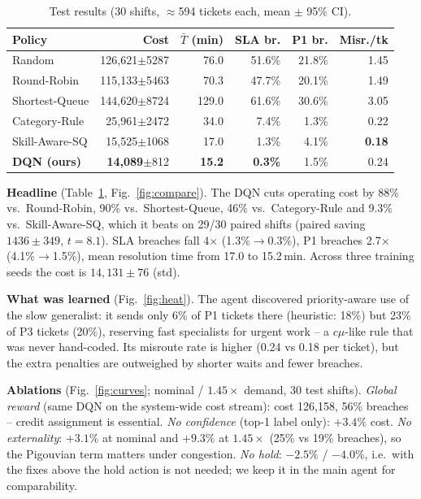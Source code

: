 \documentclass[10pt,twocolumn]{article}
\begin{document}
\begin{table}[t]
\centering\footnotesize\setlength{\tabcolsep}{2.4pt}
\caption{Test results (30 shifts, $\approx$594 tickets each, mean $\pm$ 95\% CI).}
\label{tab:main}
\begin{tabular}{lrrrrr}
\toprule
Policy & Cost & $\bar T$ (min) & SLA br. & P1 br. & Misr./tk\\
\midrule
Random         & 126{,}621$\pm$5287 & 76.0 & 51.6\% & 21.8\% & 1.45\\
Round-Robin    & 115{,}133$\pm$5463 & 70.3 & 47.7\% & 20.1\% & 1.49\\
Shortest-Queue & 144{,}620$\pm$8724 & 129.0 & 61.6\% & 30.6\% & 3.05\\
Category-Rule  & 25{,}961$\pm$2472 & 34.0 & 7.4\% & 1.3\% & 0.22\\
Skill-Aware-SQ & 15{,}525$\pm$1068 & 17.0 & 1.3\% & 4.1\% & \textbf{0.18}\\
\textbf{DQN (ours)} & \textbf{14{,}089}$\pm$812 & \textbf{15.2} & \textbf{0.3\%} & 1.5\% & 0.24\\
\bottomrule
\end{tabular}
\end{table}


\textbf{Headline} (Table~\ref{tab:main}, Fig.~\ref{fig:compare}). The DQN cuts operating cost by 88\% vs.\ Round-Robin,
90\% vs.\ Shortest-Queue, 46\% vs.\ Category-Rule and 9.3\% vs.\ Skill-Aware-SQ, which it beats
on 29/30 paired shifts (paired saving $1436\pm349$, $t{=}8.1$). SLA breaches fall
4$\times$ (1.3\%$\to$0.3\%), P1 breaches 2.7$\times$ (4.1\%$\to$1.5\%), mean resolution time from
17.0 to 15.2\,min. Across three training seeds the cost is $14{,}131\pm76$ (std).

\textbf{What was learned} (Fig.~\ref{fig:heat}). The agent discovered priority-aware use of the
slow generalist: it sends only 6\% of P1 tickets there (heuristic: 18\%) but 23\% of P3 tickets
(20\%), reserving fast specialists for urgent work -- a $c\mu$-like rule that was never
hand-coded. Its misroute rate is higher (0.24 vs 0.18 per ticket), but the extra penalties are
outweighed by shorter waits and fewer breaches.

\textbf{Ablations} (Fig.~\ref{fig:curves}; nominal / $1.45\times$ demand, 30 test shifts).
\emph{Global reward} (same DQN on the system-wide cost stream): cost 126{,}158, 56\% breaches --
credit assignment is essential. \emph{No confidence} (top-1 label only): $+3.4\%$ cost.
\emph{No externality}: $+3.1\%$ at nominal and $+9.3\%$ at $1.45\times$ (25\% vs 19\% breaches),
so the Pigouvian term matters under congestion. \emph{No hold}: $-2.5\%$ / $-4.0\%$, i.e.\ with
the fixes above the hold action is not needed; we keep it in the main agent for comparability.
\end{document}
